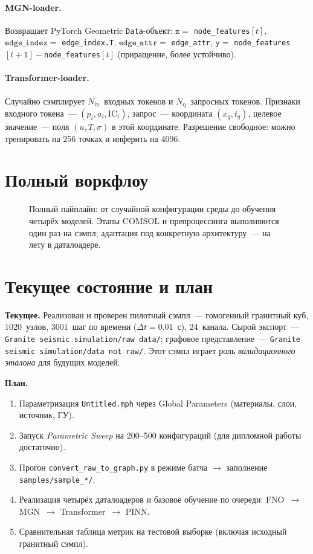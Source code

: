 \documentclass[12pt]{article}
\begin{document}
\paragraph{MGN-loader.} Возвращает PyTorch Geometric \texttt{Data}-объект:
$\mathtt{x} = $ \texttt{node\_features}$[t]$,
$\mathtt{edge\_index} = $ \texttt{edge\_index.T},
$\mathtt{edge\_attr} = $ \texttt{edge\_attr},
$\mathtt{y} = $ \texttt{node\_features}$[t{+}1] - $\texttt{node\_features}$[t]$
(приращение, более устойчиво).

\paragraph{Transformer-loader.} Случайно сэмплирует
$N_{\mathrm{in}}$~входных токенов и $N_{\mathrm{q}}$~запросных токенов.
Признаки входного токена~--- $(p_i, a_i, \mathrm{IC}_i)$, запрос~---
координата $(x_q, t_q)$, целевое значение~--- поля $(u, T, \sigma)$ в
этой координате. Разрешение свободное: можно тренировать на 256 точках
и инферить на 4096.

\section{Полный воркфлоу}

\begin{figure}[h]
\centering

\caption{Полный пайплайн: от случайной конфигурации среды до обучения
четырёх моделей. Этапы COMSOL и препроцессинга выполняются один раз
на сэмпл; адаптация под конкретную архитектуру~--- на лету в даталоадере.}
\label{fig:pipeline}
\end{figure}

\section{Текущее состояние и план}

\textbf{Текущее.} Реализован и проверен пилотный сэмпл~---
гомогенный гранитный куб, $1020$~узлов, $3001$~шаг по времени
($\Delta t = 0.01$~с), $24$~канала. Сырой экспорт~---
\texttt{Granite seismic simulation/raw data/}; графовое представление~---
\texttt{Granite seismic simulation/data not raw/}. Этот сэмпл играет роль
\emph{валидационного эталона} для будущих моделей.

\textbf{План.}
\begin{enumerate}[leftmargin=1.4em,itemsep=2pt]
\item Параметризация \texttt{Untitled.mph} через Global Parameters
      (материалы, слои, источник, ГУ).
\item Запуск \textit{Parametric Sweep} на 200--500 конфигураций
      (для дипломной работы достаточно).
\item Прогон \texttt{convert\_raw\_to\_graph.py} в режиме батча
      $\rightarrow$ заполнение \texttt{samples/sample\_*/}.
\item Реализация четырёх даталоадеров и базовое обучение по очереди:
      FNO~$\rightarrow$ MGN~$\rightarrow$ Transformer~$\rightarrow$ PINN.
\item Сравнительная таблица метрик на тестовой выборке
      (включая исходный гранитный сэмпл).
\end{enumerate}
\end{document}
